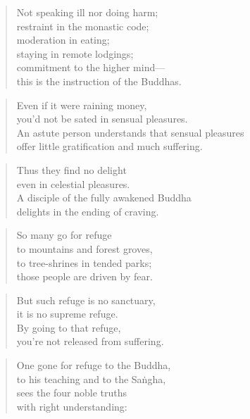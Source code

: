 \documentclass[12pt,openany]{book}%
\begin{document}
\begin{verse}%
Not speaking ill nor doing harm; \\
restraint in the monastic code; \\
moderation in eating; \\
staying in remote lodgings; \\
commitment to the higher mind—\\
this is the instruction of the Buddhas. 

%
\end{verse}

\begin{verse}%
Even if it were raining money, \\
you’d not be sated in sensual pleasures. \\
An astute person understands that sensual pleasures \\
offer little gratification and much suffering. 

%
\end{verse}

\begin{verse}%
Thus they find no delight \\
even in celestial pleasures. \\
A disciple of the fully awakened Buddha \\
delights in the ending of craving. 

%
\end{verse}

\begin{verse}%
So many go for refuge \\
to mountains and forest groves, \\
to tree-shrines in tended parks; \\
those people are driven by fear. 

%
\end{verse}

\begin{verse}%
But such refuge is no sanctuary, \\
it is no supreme refuge. \\
By going to that refuge, \\
you’re not released from suffering. 

%
\end{verse}

\begin{verse}%
One gone for refuge to the Buddha, \\
to his teaching and to the \textsanskrit{Saṅgha}, \\
sees the four noble truths \\
with right understanding: 

%
\end{verse}
\end{document}
